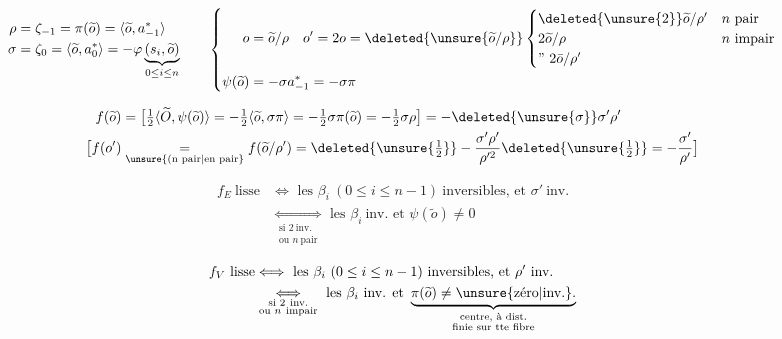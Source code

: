 
\[
\begin{aligned}
\rho&=\zeta_{-1}=\pi(\widetilde{o})=\langle\widetilde{o},a_{-1}^*\rangle\\
\sigma&=\zeta_0=\langle\widetilde{o},a_0^*\rangle=-\varphi\underbrace{(s_i,\widetilde{o})}_{0\le i\le n}
\end{aligned}
\qquad
\left\{\begin{aligned}
o&=\widetilde{o}/\rho\quad o'=2o=\deleted{\unsure{\widetilde{o}/\rho}}\begin{cases}\deleted{\unsure{2}}\widetilde{o}/\rho'&n\ \text{pair}\\2\widetilde{o}/\rho&n\ \text{impair}\\ \text{''}\ 2\bar{o}/\rho'&\end{cases}\\
\psi(\widetilde{o})&=-\sigma a_{-1}^*=-\sigma\pi
\end{aligned}\right.
\]

\[
\begin{aligned}
f(\widetilde{o})&=\bigl[\tfrac12\langle\widetilde{O},\psi(\widetilde{o})\rangle=-\tfrac12\langle\widetilde{o},\sigma\pi\rangle=-\tfrac12\sigma\pi(\widetilde{o})=-\tfrac12\sigma\rho\bigr]=-\deleted{\unsure{\sigma}}\sigma'\rho'\\
\bigl[f(o')&\underset{\text{\unsure{(n pair|en pair}}}{=} f(\widetilde{o}/\rho')=\deleted{\unsure{\tfrac12}}-\frac{\sigma'\rho'}{\rho'^2}\deleted{\unsure{\tfrac12}}=-\frac{\sigma'}{\rho'}\bigr]
\end{aligned}
\]

\[
\begin{aligned}
f_E\ \text{lisse}&\Longleftrightarrow\text{ les }\beta_i\ (0\le i\le n-1)\ \text{inversibles, et }\sigma'\ \text{inv.}\\
&\underset{\substack{\text{si }2\ \text{inv.}\\\text{ou }n\ \text{pair}}}{\Longleftrightarrow}\text{ les }\beta_i\ \text{inv. et }\psi(\widetilde{o})\ne0
\end{aligned}
\]

\[
\begin{aligned}
f_V\ \text{lisse}&\Longleftrightarrow\text{ les }\beta_i\ (0\le i\le n-1)\ \text{inversibles, et }\rho'\ \text{inv.}\\
&\underset{\substack{\text{si }2\ \text{inv.}\\\text{ou }n\ \text{impair}}}{\Longleftrightarrow}
\text{ les }\beta_i\ \text{inv. et }\underbrace{\pi(\widetilde{o})\ne\text{\unsure{zéro|inv.}.}}_{\substack{\text{centre, à dist.}\\\text{finie sur tte fibre}}}
\end{aligned}
\]


